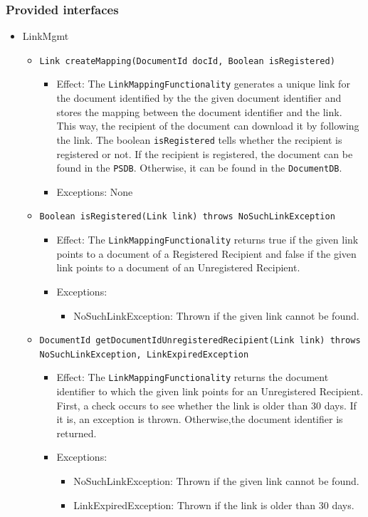 \documentclass[a4paper,10pt]{article}
\begin{document}
\subsubsection*{Provided interfaces}
\begin{itemize}
    \item LinkMgmt
    \begin{itemize}
        \item \texttt{Link createMapping(DocumentId docId, Boolean isRegistered)}
        \begin{itemize}
            \item Effect: The \texttt{LinkMappingFunctionality} generates a unique link for the document identified by the the given document identifier and stores the mapping between the document identifier and the link. This way, the recipient of the document can download it by following the link. The boolean \texttt{isRegistered} tells whether the recipient is registered or not. If the recipient is registered, the document can be found in the \texttt{PSDB}. Otherwise, it can be found in the \texttt{DocumentDB}.
            \item Exceptions: None
		\end{itemize}

		\item \texttt{Boolean isRegistered(Link link) throws NoSuchLinkException}
		 \begin{itemize}
            \item Effect: The \texttt{LinkMappingFunctionality} returns true if the given link points to a document of a Registered Recipient and false if the given link points to a document of an Unregistered Recipient.
            \item Exceptions: 
            \begin{itemize}
            	\item NoSuchLinkException: Thrown if the given link cannot be found.
            \end{itemize}
		\end{itemize}
		
		\item \texttt{DocumentId getDocumentIdUnregisteredRecipient(Link link) throws NoSuchLinkException, LinkExpiredException}
		 \begin{itemize}
            \item Effect: The \texttt{LinkMappingFunctionality} returns the document identifier to which the given link points for an Unregistered Recipient. First, a check occurs to see whether the link is older than 30 days. If it is, an exception is thrown. Otherwise,the document identifier is returned.
            \item Exceptions: 
            \begin{itemize}
            	\item NoSuchLinkException: Thrown if the given link cannot be found.
            	\item LinkExpiredException: Thrown if the link is older than 30 days.
            \end{itemize}
		\end{itemize}		


\end{itemize}
\end{itemize}
\end{document}
